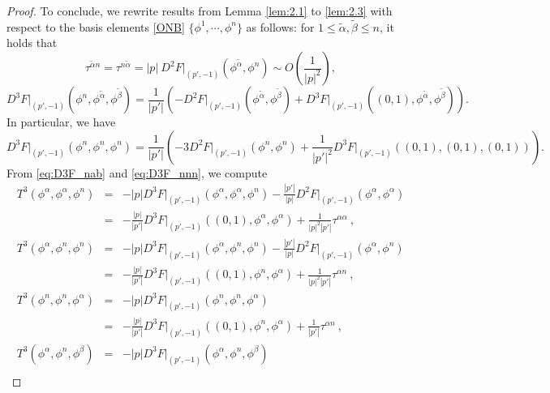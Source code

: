 \documentclass[12pt]{article}
\numberwithin{equation}{section}
\theoremstyle{plain}
\theoremstyle{definition}
\theoremstyle{remark}
\begin{document}
\begin{proof}
To conclude, we rewrite results from Lemma \ref{lem:2.1} to \ref{lem:2.3} with respect to the basis elements
\eqref{ONB} $\{\phi^1, \cdots, \phi^n\}$ as follows:
for $1 \leq \tilde{\alpha}, \tilde{\beta}\leq n$, it holds that
\begin{equation} \label{eq:tau_an}
    \tau^{\tilde{\alpha}n} = \tau^{n \tilde{\alpha} } = |p| \  D^2 F\Big|_{(p',-1)}(\phi^{\tilde{\alpha}}, \phi^n) \sim O \left( \frac{1}{|p|^2}    \right),
\end{equation}
\begin{equation}  \label{eq:D3F_nab}
    D^3 F\Big|_{(p',-1)} (\phi^n,\phi^{\tilde{\alpha}}, \phi^{\tilde{\beta}} ) =  \frac{1}{|p'|} \left( -D^2 F\Big|_{(p',-1)}(\phi^{\tilde{\alpha}}, \phi^{\tilde{\beta}}) + D^3 F\Big|_{(p',-1)}((0,1),\phi^{\tilde{\alpha}}, \phi^{\tilde{\beta}}) \right).
\end{equation}
In particular, we have
\begin{equation}  \label{eq:D3F_nnn}
    D^3 F\Big|_{(p',-1)} (\phi^n,\phi^n, \phi^n ) = \frac{1}{|p'|} \left( -3 D^2 F\Big|_{(p',-1)}(\phi^{n}, \phi^{n}) + \frac{1}{|p'|^2}  D^3 F\Big|_{(p',-1)}((0,1),(0,1),(0,1)) \right).
\end{equation}
From \eqref{eq:D3F_nab} and \eqref{eq:D3F_nnn}, we compute
\begin{eqnarray*}
T^3 (\phi^{\alpha}, \phi^{\alpha}, \phi^{n})    
     & = & - |p| D^3 F\Big|_{(p',-1)} (\phi^{\alpha}, \phi^{\alpha}, \phi^{n}) - \frac{|p'|}{|p|} D^2 F\Big|_{(p',-1)} (\phi^{\alpha}, \phi^{\alpha})    \\
    & = & - \frac{|p|}{|p'|} D^3 F\Big|_{(p',-1)} ((0,1),\phi^{\alpha}, \phi^{\alpha}) + \frac{1}{|p|^2|p'|}  \tau^{\alpha \alpha} \ , \\
    T^3 (\phi^{\alpha}, \phi^n, \phi^n) & = & - |p| D^3 F\Big|_{(p',-1)} (\phi^{\alpha}, \phi^n, \phi^n) - \frac{|p'|}{|p|} D^2 F\Big|_{(p',-1)} (\phi^{\alpha}, \phi^n) \\
     & = & - \frac{|p|}{|p'|} D^3 F\Big|_{(p',-1)} ((0,1), \phi^n, \phi^{\alpha}) + \frac{1}{|p|^2|p'|} \tau^{\alpha n} \ , \\
    T^3 (\phi^{n}, \phi^{n}, \phi^{\alpha}) & = & - |p| D^3 F\Big|_{(p',-1)} (\phi^n, \phi^n, \phi^{\alpha}) \\
    & = & - \frac{|p|}{|p'|} D^3 F\Big|_{(p',-1)} ((0,1), \phi^n, \phi^{\alpha}) + \frac{1}{|p'|} \tau^{\alpha n} \ , \\ 
    T^3 (\phi^{\alpha}, \phi^n, \phi^{\beta}) & = & -|p| D^3 F\Big|_{(p',-1)} (\phi^{\alpha}, \phi^n, \phi^{\beta})  \\

\end{eqnarray*}
\end{proof}
\end{document}
